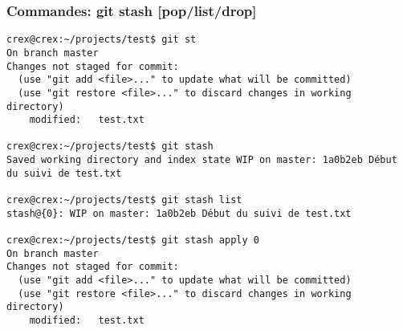 \documentclass{beamer}
\begin{document}
\begin{frame}[fragile]
\frametitle{Commandes: git stash [pop/list/drop]}

\begin{mdframed}[style=Bash]
    \begin{lstlisting}[style=Bash, caption={Exemple de fonctionnement du stash}]
crex@crex:~/projects/test$ git st
On branch master
Changes not staged for commit:
  (use "git add <file>..." to update what will be committed)
  (use "git restore <file>..." to discard changes in working directory)
	modified:   test.txt
	
crex@crex:~/projects/test$ git stash
Saved working directory and index state WIP on master: 1a0b2eb Début du suivi de test.txt

crex@crex:~/projects/test$ git stash list
stash@{0}: WIP on master: 1a0b2eb Début du suivi de test.txt

crex@crex:~/projects/test$ git stash apply 0
On branch master
Changes not staged for commit:
  (use "git add <file>..." to update what will be committed)
  (use "git restore <file>..." to discard changes in working directory)
	modified:   test.txt
    \end{lstlisting}
\end{mdframed}
\end{frame}
\end{document}
